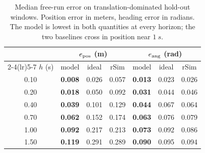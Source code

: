 \begin{table}[t]
  \caption{Median free-run error on translation-dominated hold-out windows.
  Position error in meters, heading error in radians. The model is lowest in
  both quantities at every horizon; the two baselines cross in position near
  $\SI{1}{s}$.}
  \label{tab:three}
  \centering
  \setlength{\tabcolsep}{4pt}
  \begin{tabular}{ccccccc}
    \toprule
    & \multicolumn{3}{c}{$e_{\mathrm{pos}}$ (m)} & \multicolumn{3}{c}{$e_{\mathrm{ang}}$ (rad)} \\
    \cmidrule(lr){2-4}\cmidrule(lr){5-7}
    $h$ (s) & model & ideal & rSim & model & ideal & rSim \\
    \midrule
    0.10 & \textbf{0.008} & 0.026 & 0.057 & \textbf{0.013} & 0.023 & 0.026 \\
    0.20 & \textbf{0.018} & 0.050 & 0.092 & \textbf{0.031} & 0.044 & 0.046 \\
    0.40 & \textbf{0.039} & 0.101 & 0.129 & \textbf{0.044} & 0.067 & 0.064 \\
    0.70 & \textbf{0.062} & 0.152 & 0.174 & \textbf{0.063} & 0.076 & 0.079 \\
    1.00 & \textbf{0.092} & 0.217 & 0.213 & \textbf{0.073} & 0.092 & 0.086 \\
    1.50 & \textbf{0.119} & 0.291 & 0.289 & \textbf{0.090} & 0.095 & 0.094 \\
    \bottomrule
  \end{tabular}
\end{table}
